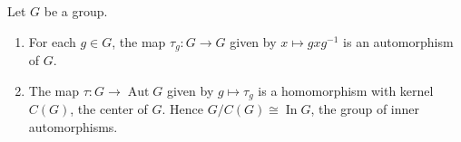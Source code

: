 Let $G$ be a group.
\begin{enumerate}
\item[(i)] For each $g \in G$, the map $\tau_g: G \to G$ given by $x \mapsto gxg^{-1}$ is an automorphism of $G$.
\item[(ii)] The map $\tau: G \to \operatorname{Aut} G$ given by $g \mapsto \tau_g$ is a homomorphism with kernel $C(G)$, the center of $G$. Hence $G/C(G) \cong \operatorname{In} G$, the group of inner automorphisms.
\end{enumerate}

